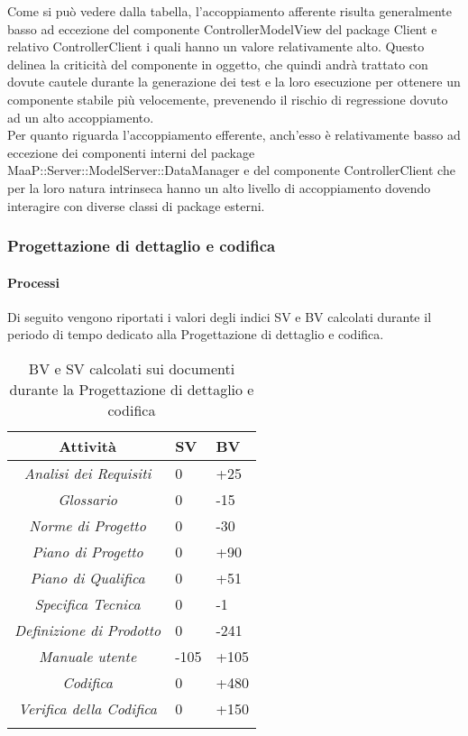 Come si può vedere dalla tabella, l'accoppiamento afferente risulta generalmente basso ad eccezione del componente ControllerModelView del package Client e relativo ControllerClient i quali hanno un valore relativamente alto. Questo delinea la criticità del componente in oggetto, che quindi andrà trattato con dovute cautele durante la generazione dei test e la loro esecuzione per ottenere un componente stabile più velocemente, prevenendo il rischio di regressione dovuto ad un alto accoppiamento.\\
Per quanto riguarda l'accoppiamento efferente, anch'esso è relativamente basso ad eccezione dei componenti interni del package MaaP::Server::ModelServer::DataManager e del componente ControllerClient che per la loro natura intrinseca hanno un alto livello di accoppiamento dovendo interagire con diverse classi di package esterni.

\subsubsection{Progettazione di dettaglio e codifica}
\paragraph{Processi}
Di seguito vengono riportati i valori degli indici SV e BV calcolati durante il periodo di tempo dedicato alla Progettazione di dettaglio e codifica.
\begin{longtable}{|c|p{3cm}|p{3cm}|}
\toprule
\textbf{Attività} & \textbf{SV} & \textbf{BV} \\


\midrule
\emph{Analisi dei Requisiti} & 0 & +25 \\
\midrule
\emph{Glossario} & 0 & -15  \\
\midrule
\emph{Norme di Progetto} & 0 & -30 \\
\midrule
\emph{Piano di Progetto} & 0 & +90 \\
\midrule
\emph{Piano di Qualifica} & 0 & +51\\
\midrule
\emph{Specifica Tecnica} & 0 & -1\\
\midrule
\emph{Definizione di Prodotto} & 0 & -241 \\
\midrule
\emph{Manuale utente} & -105 & +105 \\
\midrule
\emph{Codifica} & 0 & +480 \\
\midrule
\emph{Verifica della Codifica} & 0 & +150 \\
\bottomrule
\caption{BV e SV calcolati sui documenti durante la Progettazione di dettaglio e codifica}
\label{tab:changelog}
\end{longtable}

